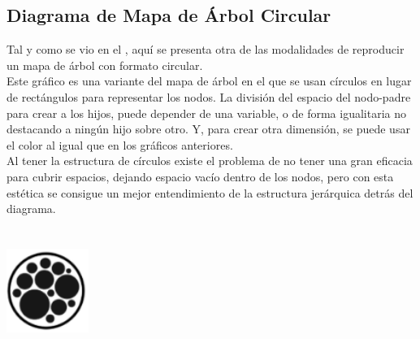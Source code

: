 \documentclass{article}\usepackage[]{graphicx}\usepackage[]{color}
\begin{document}
\subsection{Diagrama de Mapa de \'Arbol Circular}
Tal y como se vio en el , aqu\'i se presenta otra de las modalidades de reproducir un mapa de \'arbol con formato circular.~\\
Este gr\'afico es una variante del mapa de \'arbol en el que se usan c\'irculos en lugar de rect\'angulos para representar los nodos. La divisi\'on del espacio del nodo-padre para crear a los hijos, puede depender de una variable, o de forma igualitaria no destacando a ning\'un hijo sobre otro. Y, para crear otra dimensi\'on, se puede usar el color al igual que en los gr\'aficos anteriores.~\\ Al tener la estructura de c\'irculos existe el problema de no tener una gran eficacia para cubrir espacios, dejando espacio vac\'io dentro de los nodos, pero con esta est\'etica se consigue un mejor entendimiento de la estructura jer\'arquica detr\'as del diagrama.
~\\~\\~\\
\vbox{
    \centering
    \includegraphics[width=0.2\textwidth]{imag/arbol}
}
\end{document}
